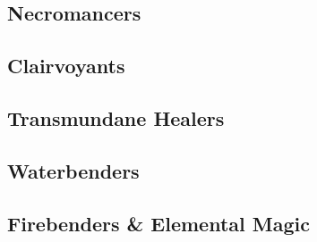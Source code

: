 \documentclass{LegrandOrangeTufteBook}
\begin{document}
\subsection*{Necromancers}

\subsection*{Clairvoyants}

\subsection*{Transmundane Healers}

\subsection*{Waterbenders}

\subsection*{Firebenders \& Elemental Magic}
\end{document}
